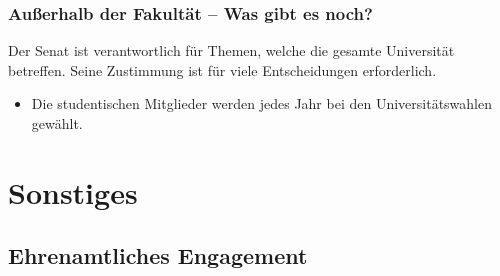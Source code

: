 \documentclass[10pt]{beamer}
\begin{document}
\begin{frame}
	\frametitle{Außerhalb der Fakultät -- Was gibt es noch?}

	\begin{block}{\vphantom{X}}
		Der Senat ist verantwortlich für Themen, welche die gesamte Universität betreffen. Seine Zustimmung ist für viele Entscheidungen erforderlich.
	\end{block}

	\begin{itemize}
		\item Die studentischen Mitglieder werden jedes Jahr bei den Universitätswahlen gewählt.
	\end{itemize}
\end{frame}


\section{Sonstiges}

\subsection*{Ehrenamtliches Engagement}
\end{document}
